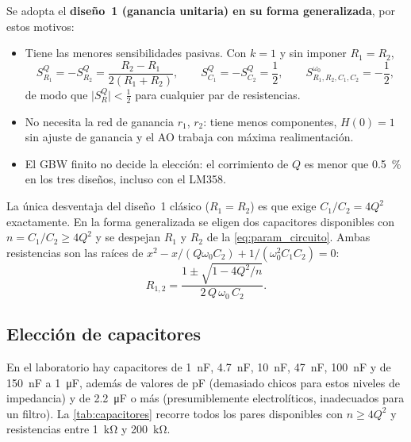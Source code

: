 Se adopta el \textbf{diseño~1 (ganancia unitaria) en su forma generalizada}, por estos motivos:
\begin{itemize}
  \item Tiene las menores sensibilidades pasivas. Con $k = 1$ y sin imponer $R_1 = R_2$,
        \begin{equation}
          S^Q_{R_1} = -S^Q_{R_2} = \frac{R_2-R_1}{2(R_1+R_2)},\qquad S^Q_{C_1} = -S^Q_{C_2} = \frac12,\qquad
          S^{\omega_0}_{R_1,R_2,C_1,C_2} = -\frac12 ,
          \label{eq:sens_k1}
        \end{equation}
        de modo que $\lvert S^Q_{R}\rvert < \tfrac12$ para cualquier par de resistencias.
  \item No necesita la red de ganancia $r_1$, $r_2$: tiene menos componentes, $H(0) = 1$ sin ajuste de ganancia y el AO trabaja con máxima
        realimentación.
  \item El GBW finito no decide la elección: el corrimiento de $Q$ es menor que \qty{0.5}{\percent} en los tres diseños, incluso con el LM358.
\end{itemize}
La única desventaja del diseño~1 clásico ($R_1 = R_2$) es que exige $C_1/C_2 = 4Q^2$ exactamente. En la forma generalizada se eligen dos
capacitores disponibles con $n = C_1/C_2 \ge 4Q^2$ y se despejan $R_1$ y $R_2$ de la \cref{eq:param_circuito}. Ambas resistencias son las raíces
de $x^2 - x/(Q\omega_0C_2) + 1/(\omega_0^2C_1C_2) = 0$:
\begin{equation}
  R_{1,2} = \frac{1\pm\sqrt{1-4Q^2/n}}{2\,Q\,\omega_0\,C_2}.
  \label{eq:R12}
\end{equation}

\subsection{Elección de capacitores}
En el laboratorio hay capacitores de \qty{1}{\nano\farad}, \qty{4.7}{\nano\farad}, \qty{10}{\nano\farad}, \qty{47}{\nano\farad},
\qty{100}{\nano\farad} y de \qty{150}{\nano\farad} a \qty{1}{\micro\farad}, además de valores de pF (demasiado chicos para estos niveles de
impedancia) y de \qty{2.2}{\micro\farad} o más (presumiblemente electrolíticos, inadecuados para un filtro). La \cref{tab:capacitores} recorre
todos los pares disponibles con $n \ge 4Q^2$ y resistencias entre \qty{1}{\kilo\ohm} y \qty{200}{\kilo\ohm}.

\begin{table}[H]
  \centering\small
  \caption{Pares de capacitores disponibles para el Sallen--Key, ordenados por sensibilidad de $Q$ a las resistencias. La última columna es el error
  de $f_0$ si cada resistencia se redondea a un único valor E24.}
  \label{tab:capacitores}
\end{table}

